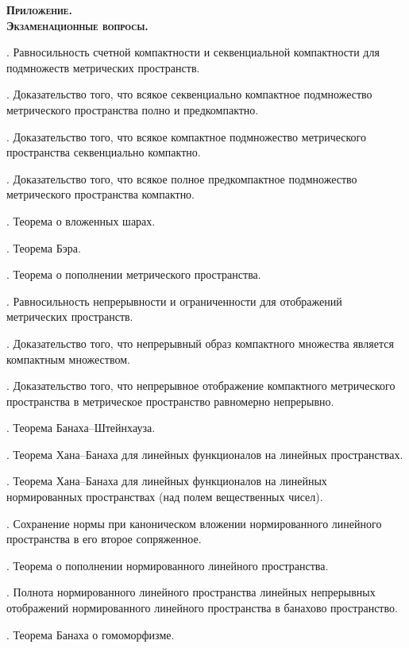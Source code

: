 \documentclass[10pt]{article}
\begin{document}
\begin{center}
\textbf{\textsc{Приложение. \\ Экзаменационные вопросы.}}
\end{center}

\vspace{7pt}

. Равносильность счетной компактности и секвенциальной
компактности для подмножеств метрических пространств.

. Доказательство того, что всякое секвенциально
компактное подмножество  метрического пространства полно и
предкомпактно.

. Доказательство того, что всякое компактное подмножество
метрического пространства секвенциально компактно.

. Доказательство того, что всякое полное предкомпактное
подмножество метрического пространства компактно.

. Теорема о вложенных шарах.

. Теорема Бэра.

. Теорема о пополнении метрического пространства.

. Равносильность непрерывности и ограниченности для
отображений метрических пространств.

. Доказательство того, что непрерывный образ компактного
множества является компактным множеством.

. Доказательство того, что непрерывное отображение
компактного ме\-трического пространства в метрическое пространство
равномерно непрерывно.

. Теорема Банаха--Штейнхауза.

. Теорема Хана--Банаха для линейных функционалов на
линейных пространствах.

. Теорема Хана--Банаха для линейных функционалов на
линейных нормированных пространствах (над полем вещественных чисел).

. Сохранение нормы при каноническом вложении
нормированного линейного пространства в его второе сопряженное.

. Теорема о пополнении нормированного линейного
пространства.

. Полнота нормированного линейного пространства линейных
непрерывных отображений нормированного линейного пространства в
банахово пространство.

. Теорема Банаха о гомоморфизме.
\end{document}
